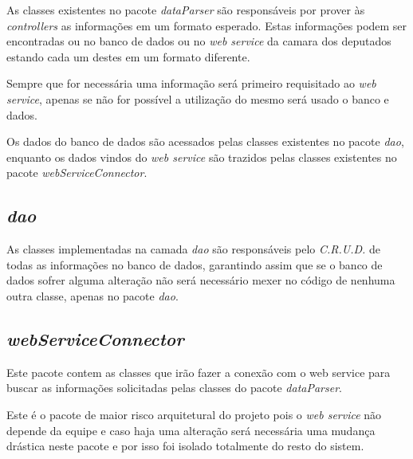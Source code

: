 	As classes existentes no pacote \textit{dataParser} são responsáveis por prover às \textit{controllers} as informações em um formato esperado. Estas informações podem ser encontradas ou no banco de dados ou no \textit{web service} da camara dos deputados estando cada um destes em um formato diferente.

	Sempre que for necessária uma informação será primeiro requisitado ao \textit{web service}, apenas se não for possível a utilização do mesmo será usado o banco e dados.

	Os dados do banco de dados são acessados pelas classes existentes no pacote \textit{dao}, enquanto os dados vindos do \textit{web service} são trazidos pelas classes existentes no pacote \textit{webServiceConnector}.

\subsection{\textit{dao}}

	As classes implementadas na camada \textit{dao} são responsáveis pelo \textit{C.R.U.D.} de todas as informações no banco de dados, garantindo assim que se o banco de dados sofrer alguma alteração não será necessário mexer no código de nenhuma outra classe, apenas no pacote \textit{dao}.

\subsection{\textit{webServiceConnector}} 

	Este pacote contem as classes que irão fazer a conexão com o web service para buscar as informações solicitadas pelas classes do pacote \textit{dataParser}.

	Este é o pacote de maior risco arquitetural do projeto pois o \textit{web service} não depende da equipe e caso haja uma alteração será necessária uma mudança drástica neste pacote e por isso foi isolado totalmente do resto do sistem.
